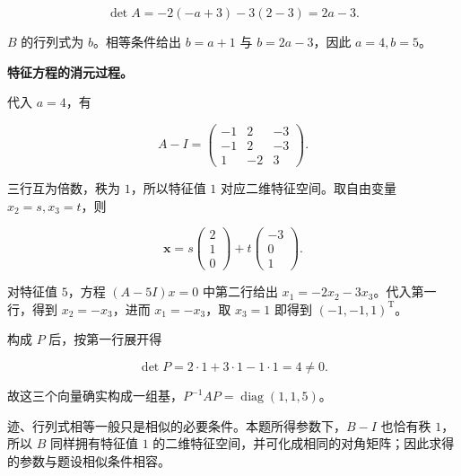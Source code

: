 \documentclass[UTF8,11pt,fontset=windows]{ctexart}
\begin{document}
$$
\det A=-2(-a+3)-3(2-3)=2a-3.
$$

$B$ 的行列式为 $b$。相等条件给出 $b=a+1$ 与 $b=2a-3$，因此 $a=4,b=5$。

\textbf{特征方程的消元过程。}

代入 $a=4$，有

$$
A-I=\begin{pmatrix}-1&2&-3\\-1&2&-3\\1&-2&3\end{pmatrix}.
$$

三行互为倍数，秩为 $1$，所以特征值 $1$ 对应二维特征空间。取自由变量 $x_2=s,x_3=t$，则

$$
\boldsymbol x=s\begin{pmatrix}2\\1\\0\end{pmatrix}
+t\begin{pmatrix}-3\\0\\1\end{pmatrix}.
$$

对特征值 $5$，方程 $(A-5I)x=0$ 中第二行给出 $x_1=-2x_2-3x_3$。代入第一行，得到 $x_2=-x_3$，进而 $x_1=-x_3$，取 $x_3=1$ 即得到 $(-1,-1,1)^{\mathrm T}$。

构成 $P$ 后，按第一行展开得

$$
\det P=2\cdot1+3\cdot1-1\cdot1=4\ne0.
$$

故这三个向量确实构成一组基，$P^{-1}AP=\operatorname{diag}(1,1,5)$。

迹、行列式相等一般只是相似的必要条件。本题所得参数下，$B-I$ 也恰有秩 $1$，所以 $B$ 同样拥有特征值 $1$ 的二维特征空间，并可化成相同的对角矩阵；因此求得的参数与题设相似条件相容。
\end{document}

